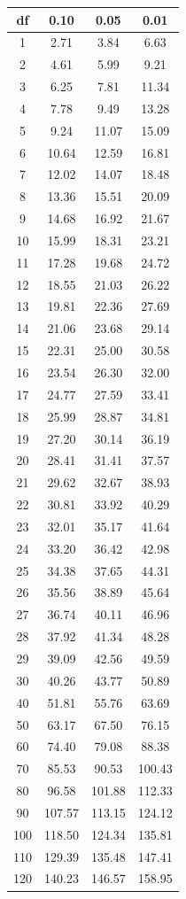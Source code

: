 \documentclass[
]{book}
\theoremstyle{definition}
\theoremstyle{definition}
\theoremstyle{definition}
\theoremstyle{definition}
\theoremstyle{remark}
\begin{document}
\begin{longtable}[]{@{}cccc@{}}
\toprule()
df & 0.10 & 0.05 & 0.01 \\
\midrule()
\endhead
1 & 2.71 & 3.84 & 6.63 \\
2 & 4.61 & 5.99 & 9.21 \\
3 & 6.25 & 7.81 & 11.34 \\
4 & 7.78 & 9.49 & 13.28 \\
5 & 9.24 & 11.07 & 15.09 \\
6 & 10.64 & 12.59 & 16.81 \\
7 & 12.02 & 14.07 & 18.48 \\
8 & 13.36 & 15.51 & 20.09 \\
9 & 14.68 & 16.92 & 21.67 \\
10 & 15.99 & 18.31 & 23.21 \\
11 & 17.28 & 19.68 & 24.72 \\
12 & 18.55 & 21.03 & 26.22 \\
13 & 19.81 & 22.36 & 27.69 \\
14 & 21.06 & 23.68 & 29.14 \\
15 & 22.31 & 25.00 & 30.58 \\
16 & 23.54 & 26.30 & 32.00 \\
17 & 24.77 & 27.59 & 33.41 \\
18 & 25.99 & 28.87 & 34.81 \\
19 & 27.20 & 30.14 & 36.19 \\
20 & 28.41 & 31.41 & 37.57 \\
21 & 29.62 & 32.67 & 38.93 \\
22 & 30.81 & 33.92 & 40.29 \\
23 & 32.01 & 35.17 & 41.64 \\
24 & 33.20 & 36.42 & 42.98 \\
25 & 34.38 & 37.65 & 44.31 \\
26 & 35.56 & 38.89 & 45.64 \\
27 & 36.74 & 40.11 & 46.96 \\
28 & 37.92 & 41.34 & 48.28 \\
29 & 39.09 & 42.56 & 49.59 \\
30 & 40.26 & 43.77 & 50.89 \\
40 & 51.81 & 55.76 & 63.69 \\
50 & 63.17 & 67.50 & 76.15 \\
60 & 74.40 & 79.08 & 88.38 \\
70 & 85.53 & 90.53 & 100.43 \\
80 & 96.58 & 101.88 & 112.33 \\
90 & 107.57 & 113.15 & 124.12 \\
100 & 118.50 & 124.34 & 135.81 \\
110 & 129.39 & 135.48 & 147.41 \\
120 & 140.23 & 146.57 & 158.95 \\
\bottomrule()
\end{longtable}
\end{document}
